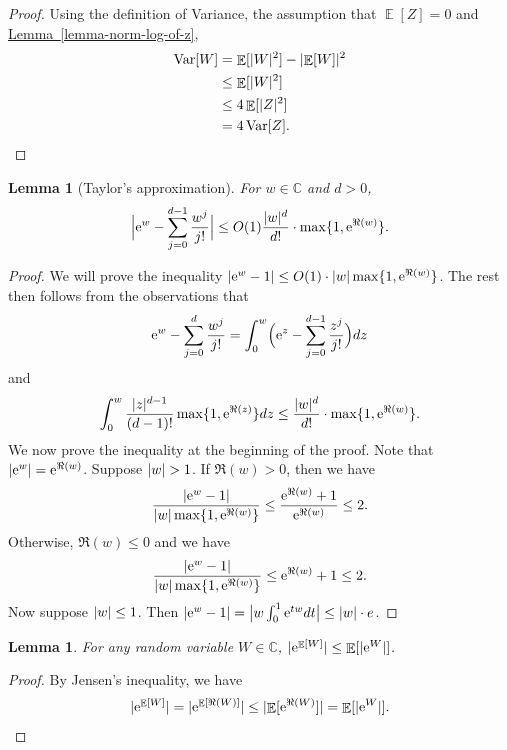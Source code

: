 \documentclass[11pt]{article}
\numberwithin{equation}{section}
\newtheorem{lemma}[theorem]{Lemma}
\theoremstyle{definition}
\theoremstyle{plain}
\newcommand{\C}{\mathbb C}
\newcommand{\eee}{\mathrm e}
\newcommand{\expref}[2]{\hyperref[#2]{#1~\ref{#2}}}
\DeclarePairedDelimiter{\abs}{\lvert}{\rvert}
\DeclareMathOperator*{\E}{\mathbb{E}}                 %
\DeclareMathOperator*{\Var}{Var}                 %
\begin{document}
  \begin{proof}
    Using the definition of Variance, the assumption that $\E[Z] = 0$ and \expref{Lemma}{lemma-norm-log-of-z},
    \begin{align*}
      \Var[W]
      &= \E[\abs{W}^2] - \abs{\E[W]}^2 \\
      &\le \E[\abs{W}^2] \\
      &\le 4 \E[\abs{Z}^2] \\
      &= 4 \Var[Z]. \qedhere
    \end{align*}
  \end{proof}

  \begin{lemma}[Taylor's approximation] \label{lemma-taylor}
    For $w \in \C$ and $d > 0$,
      \[
        \Bigl| \eee^w - \sum_{j = 0}^{d-1} \frac{w^j}{j!} \Bigr| \le O(1) \frac{ \abs{w}^d }{ d! } \cdot \max\{ 1, \eee^{\Re(w)} \}.
      \]
  \end{lemma}
  \begin{proof}
    We will prove the inequality $\abs{\eee^w - 1} \le O(1) \cdot \abs{w} \max\{1, \eee^{\Re(w)}\}$.
    The rest then follows from the observations that
    \[
      \eee^w - \sum_{j=0}^d \frac{w^j}{j!} = \int_0^w \Bigl( \eee^z - \sum_{j=0}^{d-1} \frac{z^j}{j!} \Bigr) dz 
    \]
    and
    \[
      \int_0^w \frac{\abs{z}^{d-1}}{(d-1)!} \max\{1, \eee^{\Re(z)} \} dz \le \frac{\abs{w}^d}{d!} \cdot \max\{1, \eee^{\Re(w)}\} .
    \]
    We now prove the inequality at the beginning of the proof.
    Note that $\abs{\eee^w} = \eee^{\Re(w)}$.
    Suppose $\abs{w} > 1$.
    If $\Re(w) > 0$, then we have
    \[\frac{\abs{\eee^w - 1}}{\abs{w} \max\{1, \eee^{\Re(w)}\} } \le \frac{\eee^{\Re(w)} + 1}{\eee^{\Re(w)}} \le 2.
    \]
    Otherwise, $\Re(w) \le 0$ and we have
    \[
      \frac{\abs{\eee^w - 1}}{\abs{w} \max\{1, \eee^{\Re(w)}\} } \le \eee^{\Re(w)} + 1 \le 2.
      \]
    Now suppose $\abs{w} \le 1$.
    Then $\abs{\eee^w - 1} = \bigl| w \int_0^1 \eee^{tw} dt \bigr| \le \abs{w} \cdot e$.

  \end{proof}

  \begin{lemma} \label{lemma-jensen}
    For any random variable $W \in \C$, $\abs{ \eee^{\E[W]} } \le \E[\abs{ \eee^{W} }]$.
  \end{lemma}
  \begin{proof}
    By Jensen's inequality, we have
    \[
      \abs{ \eee^{\E[W]} } = \abs{ \eee^{\E[\Re(W)]} } \le \abs{ \E[\eee^{\Re(W)}] } = \E[\abs{\eee^W}] . \qedhere
    \]
  \end{proof}
\end{document}
